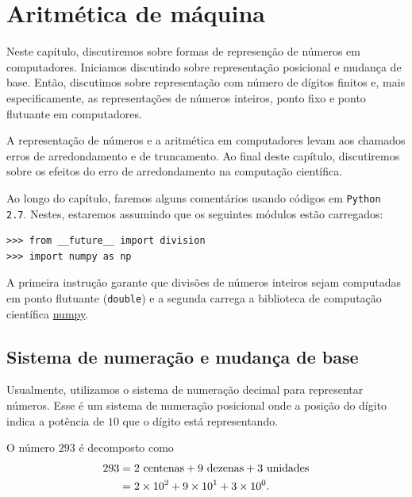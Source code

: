 
%

\chapter{Aritmética de máquina}

Neste capítulo, discutiremos sobre formas de represenção de números em computadores. Iniciamos discutindo sobre representação posicional e mudança de base. Então, discutimos sobre representação com número de dígitos finitos e, mais especificamente, as representações de números inteiros, ponto fixo e ponto flutuante em computadores.

A representação de números e a aritmética em computadores levam aos chamados erros de arredondamento e de truncamento. Ao final deste capítulo, discutiremos sobre os efeitos do erro de arredondamento na computação científica.

\ifispython
Ao longo do capítulo, faremos alguns comentários usando códigos em \verb+Python 2.7+. Nestes, estaremos assumindo que os seguintes módulos estão carregados:
\begin{verbatim}
>>> from __future__ import division
>>> import numpy as np
\end{verbatim}
A primeira instrução garante que divisões de números inteiros sejam computadas em ponto flutuante (\verb+double+) e a segunda carrega a biblioteca de computação científica \href{http://www.numpy.org/}{numpy}.
\fi

\section{Sistema de numeração e mudança de base}
Usualmente, utilizamos o sistema de numeração decimal para representar números. Esse é um sistema de numeração posicional onde a posição do dígito indica a potência de $10$ que o dígito está representando.

\begin{ex}
  O número $293$ é decomposto como
  \begin{equation*}
    \begin{split}
      293 &= 2\ \hbox{centenas}+9\ \hbox{dezenas}+3\ \hbox{unidades}\\
      &= 2\times 10^2+9\times 10^1+3\times 10^0.      
    \end{split}
  \end{equation*}
\end{ex}

